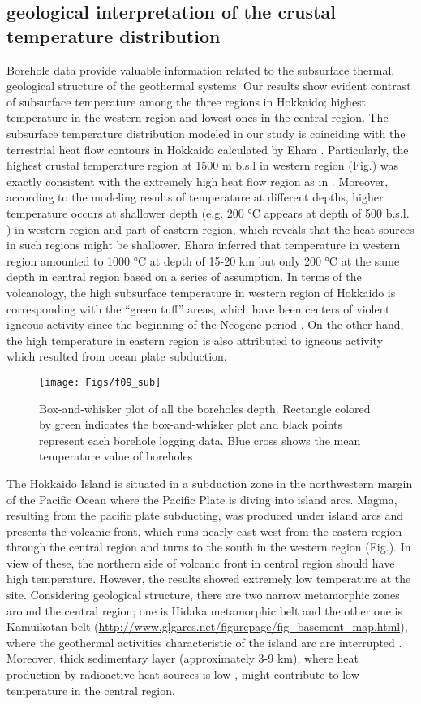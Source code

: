 \subsection{geological interpretation of the crustal temperature distribution}

Borehole data provide valuable information related to the subsurface thermal, geological structure of the geothermal systems. Our results show evident contrast of subsurface temperature among the three regions in Hokkaido; highest temperature in the western region and lowest ones in the central region. The subsurface temperature distribution modeled in our study is coinciding with the terrestrial heat flow contours in Hokkaido calculated by Ehara \cite{Ehara1972}. Particularly, the highest crustal temperature region at 1500 m b.s.l in western region (Fig.) was exactly consistent with the extremely high heat flow region as in \cite{Ehara1972}. Moreover, according to the modeling results of temperature at different depths, higher temperature occurs at shallower depth (e.g. 200 °C appears at depth of 500 b.s.l. ) in western region and part of eastern region, which reveals that the heat sources in such regions might be shallower. Ehara \cite{Ehara1972} inferred that temperature in western region amounted to 1000 °C at depth of 15-20 km but only 200 °C at the same depth in central region based on a series of assumption. In terms of the volcanology, the high subsurface temperature in western region of Hokkaido is corresponding with the “green tuff” areas, which have been centers of violent igneous activity since the beginning of the Neogene period \cite{Minato1956}. On the other hand, the high temperature in eastern region is also attributed to igneous activity which resulted from ocean plate subduction. 
\begin{figure} [ht!]
  \centering
    \texttt{[image: Figs/f09\_sub]}
  \caption{Box-and-whisker plot of all the boreholes depth. Rectangle colored by green indicates the box-and-whisker plot and black points represent each borehole logging data. Blue cross shows the mean temperature value of boreholes}
  \label{fig:3d}
\end{figure}
The Hokkaido Island is situated in a subduction zone in the northwestern margin of the Pacific Ocean where the Pacific Plate is diving into island arcs. Magma, resulting from the pacific plate subducting, was produced under island arcs and presents the volcanic front, which runs nearly east-west from the eastern region through the central region and turns to the south in the western region (Fig.). In view of these, the northern side of volcanic front in central region should have high temperature. However, the results showed extremely low temperature at the site. Considering geological structure, there are two narrow metamorphic zones around the central region; one is Hidaka metamorphic belt and the other one is Kamuikotan belt (\url{http://www.glgarcs.net/figurepage/fig_basement_map.html}), where the geothermal activities characteristic of the island arc are interrupted \cite{Ehara1972}. Moreover, thick sedimentary layer (approximately 3-9 km), where heat production by radioactive heat sources is low \cite{Kametani1964, Minato1956}, might contribute to low temperature in the central region.
	
